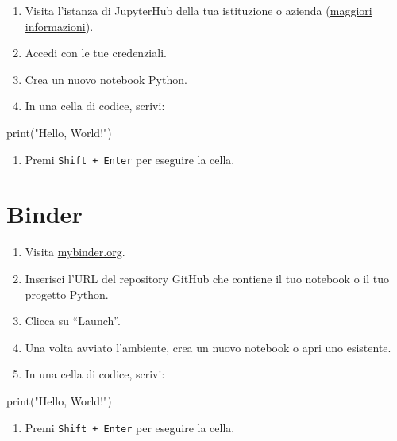 \documentclass[
  letterpaper,
  DIV=11,
  numbers=noendperiod]{scrreprt}
\newenvironment{Shaded}{\begin{snugshade}}{\end{snugshade}}
\newcommand{\BuiltInTok}[1]{\textcolor[rgb]{0.00,0.23,0.31}{#1}}
\newcommand{\NormalTok}[1]{\textcolor[rgb]{0.00,0.23,0.31}{#1}}
\newcommand{\StringTok}[1]{\textcolor[rgb]{0.13,0.47,0.30}{#1}}
\providecommand{\tightlist}{%
  \setlength{\itemsep}{0pt}\setlength{\parskip}{0pt}}\usepackage{longtable,booktabs,array}
\begin{document}
\begin{enumerate}
\def\labelenumi{\arabic{enumi}.}
\tightlist
\item
  Visita l'istanza di JupyterHub della tua istituzione o azienda
  (\href{https://jupyter.org/hub}{maggiori informazioni}).
\item
  Accedi con le tue credenziali.
\item
  Crea un nuovo notebook Python.
\item
  In una cella di codice, scrivi:
\end{enumerate}

\begin{Shaded}
\begin{Highlighting}[]
\BuiltInTok{print}\NormalTok{(}\StringTok{"Hello, World!"}\NormalTok{)}
\end{Highlighting}
\end{Shaded}

\begin{enumerate}
\def\labelenumi{\arabic{enumi}.}
\setcounter{enumi}{4}
\tightlist
\item
  Premi \texttt{Shift\ +\ Enter} per eseguire la cella.
\end{enumerate}

\section{Binder}

\begin{enumerate}
\def\labelenumi{\arabic{enumi}.}
\tightlist
\item
  Visita \href{https://mybinder.org/}{mybinder.org}.
\item
  Inserisci l'URL del repository GitHub che contiene il tuo notebook o
  il tuo progetto Python.
\item
  Clicca su ``Launch''.
\item
  Una volta avviato l'ambiente, crea un nuovo notebook o apri uno
  esistente.
\item
  In una cella di codice, scrivi:
\end{enumerate}

\begin{Shaded}
\begin{Highlighting}[]
\BuiltInTok{print}\NormalTok{(}\StringTok{"Hello, World!"}\NormalTok{)}
\end{Highlighting}
\end{Shaded}

\begin{enumerate}
\def\labelenumi{\arabic{enumi}.}
\setcounter{enumi}{5}
\tightlist
\item
  Premi \texttt{Shift\ +\ Enter} per eseguire la cella.
\end{enumerate}
\end{document}

